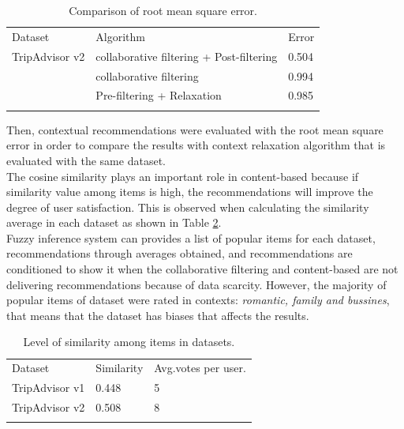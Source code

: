 \begin{table}
\centering
\small
\captionsetup{font=footnotesize}
\caption{Comparison of root mean square error.}
\label{tab:4}  
\small   
\begin{tabular}{lll}
\hline\noalign{\smallskip}
Dataset & Algorithm & Error \\
\noalign{\smallskip}\hline\noalign{\smallskip}
TripAdvisor v2 & collaborative filtering + Post-filtering  & 0.504  \\
                        & collaborative filtering                           & 0.994  \\
                        & Pre-filtering + Relaxation                     & 0.985  \\
\noalign{\smallskip}\hline
\end{tabular}
\end{table}
Then, contextual recommendations were evaluated with the 
root mean square error in order to compare the results with context 
relaxation algorithm  \cite{zheng2012differential} that is evaluated 
with the same dataset.\\ 
The cosine similarity plays an important role in content-based because
if similarity value among items is high, the recommendations will
improve the degree of user satisfaction. This is observed when
calculating the similarity average in each dataset as shown in 
Table  \ref{tab:5}.\\ 
Fuzzy inference system can provides a list of popular items for each dataset,
recommendations through averages obtained, and recommendations are
conditioned to show it when the collaborative filtering and content-based 
are not delivering recommendations because of data scarcity.
However, the majority of popular items of dataset were rated in contexts: 
\textit{romantic, family and bussines}, that means that the dataset has
biases that affects the results.

\begin{table}
\centering
\small
\captionsetup{font=footnotesize}
\caption{Level of similarity among items in datasets. }
\label{tab:5}      
\begin{tabular}{lll}
\hline\noalign{\smallskip}
Dataset  & Similarity  & Avg.votes per user. \\
\noalign{\smallskip}\hline\noalign{\smallskip}
TripAdvisor v1 & 0.448  & 5  \\
TripAdvisor v2 & 0.508  & 8  \\
\noalign{\smallskip}\hline
\end{tabular}
\end{table}

